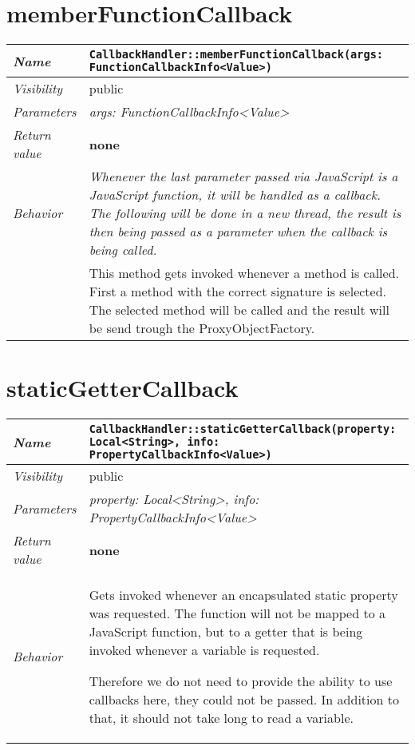  \section{memberFunctionCallback}
\begin{longtable}{p{3cm} @{\hskip 1cm} p{12cm}}
 \hline
\textit{Name} & \texttt{CallbackHandler::memberFunctionCallback(args: FunctionCallbackInfo<Value>)}\\
\hline
 \textit{Visibility} & public\\
\hline
\textit{Parameters} & \textit{args: FunctionCallbackInfo<Value>}\\
\hline
\textit{Return value} & \textbf{none}\\
  \hline
 \textit{Behavior} & \textit{Whenever the last parameter passed via JavaScript is a JavaScript function, it will be handled as a callback. The following will be done in a new thread, the result is then being passed as a parameter when the callback is being called.}\\

 & This method gets invoked whenever a method is called. First a method with the correct signature is selected.
 The selected method will be called and the result will be send trough the ProxyObjectFactory. \\
\hline
\end{longtable} \pagebreak
 \section{staticGetterCallback}
\begin{longtable}{p{3cm} @{\hskip 1cm} p{12cm}}
 \hline
\textit{Name} & \texttt{CallbackHandler::staticGetterCallback(property: Local<String>, info: PropertyCallbackInfo<Value>)}\\
\hline
 \textit{Visibility} & public\\
\hline
\textit{Parameters} & \textit{property: Local<String>, info: PropertyCallbackInfo<Value>}\\
\hline
\textit{Return value} & \textbf{none}\\
  \hline
 \textit{Behavior} &  Gets invoked whenever an encapsulated static property was requested. The function will not be mapped to a JavaScript function, but to a getter that is being invoked whenever a variable is requested.

 Therefore we do not need to provide the ability to use callbacks here, they could not be passed. In addition to that, it should not take long to read a variable. \\
\hline
\end{longtable}
